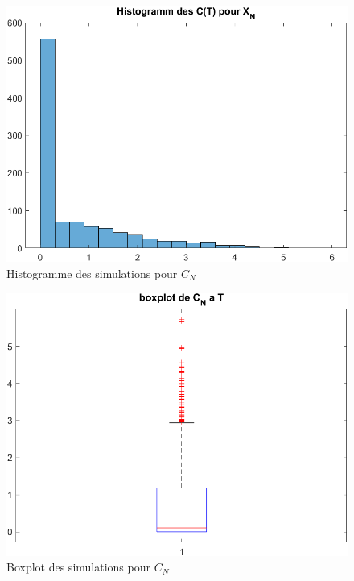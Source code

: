 \documentclass[a4paper,12pt]{scrartcl}
\begin{document}
\begin{figure}[h!]
  \begin{center}
    \includegraphics[width=14cm]{"graphiques/hist_C_N.png"}
    \caption{Histogramme des simulations pour $C_{N}$}
    \label{fig:hist_C_N}
  \end{center}
\end{figure}

\begin{figure}[h!]
  \begin{center}
    \includegraphics[width=14cm]{"graphiques/box_C_N.png"}
    \caption{Boxplot des simulations pour $C_{N}$}
    \label{fig:box_C_N}
  \end{center}
\end{figure}
\end{document}
